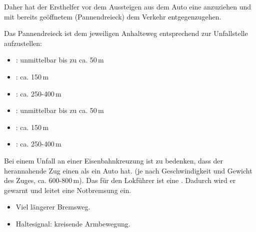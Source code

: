 
Daher hat der Ersthelfer vor dem Aussteigen aus dem Auto
eine  anzuziehen und mit bereits
geöffnetem  (Pannendreieck) dem 
Verkehr entgegenzugehen. 


{
Das Pannendreieck ist
dem jeweiligen Anhalteweg entsprechend zur Unfallstelle
aufzustellen:
\begin{itemize}
    \item {}: unmittelbar bis zu ca. 50\,m
    \item {}: ca. 150\,m
    \item {}: ca. 250-400\,m
\end{itemize}
}{
\begin{itemize}
    \item {}: unmittelbar bis zu ca. 50\,m
    \item {}: ca. 150\,m
    \item {}: ca. 250-400\,m
\end{itemize}
}{}{}{}

{
Bei einem Unfall an einer Eisenbahnkreuzung ist zu bedenken, dass der
herannahende Zug einen  als ein
Auto hat. (je nach Geschwindigkeit und
Gewicht des Zuges, ca. 600-800\,m). Das  für den Lokführer ist
eine . Dadurch wird er gewarnt und leitet 
eine Notbremsung ein.
}{
\begin{itemize}
    \item Viel längerer Bremsweg.
    \item Haltesignal: kreisende Armbewegung.
\end{itemize}
}{}{}{}





